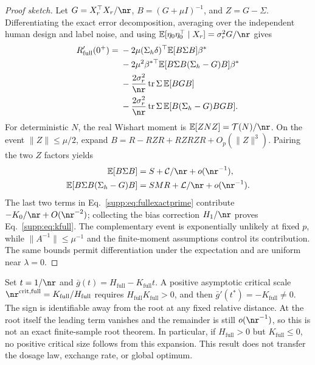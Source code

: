 \begin{proof}[Proof sketch]
Let $G=X_r^\top X_r/\nr$, $B=(G+\mu I)^{-1}$, and $Z=G-\Sigma$. Differentiating the exact error decomposition, averaging over the independent human design and label noise, and using $\mathbb E[\eta_0\eta_0^\top\mid X_r]=\sigma_r^2G/\nr$ gives
\begin{align}
  R_{\mathrm{full}}'(0^+)={}&-2\mu(\Sigma_h\delta)^\top\mathbb E[B\Sigma B]\beta^*\notag\\
  &-2\mu^2\beta^{*\top}\mathbb E[B\Sigma B(\Sigma_h-G)B]\beta^*\notag\\
  &-\frac{2\sigma_r^2}{\nr}\operatorname{tr}\Sigma\,\mathbb E[BGB]\notag\\
  &-\frac{2\sigma_r^2}{\nr}\operatorname{tr}\Sigma\,\mathbb E[B(\Sigma_h-G)BGB].
  \label{supp:eq:fullexactprime}
\end{align}
For deterministic $N$, the real Wishart moment is
$\mathbb E[ZNZ]=\mathcal T(N)/\nr$. On the event $\|Z\|\le\mu/2$, expand
$B=R-RZR+RZRZR+O_p(\|Z\|^3)$.
Pairing the two $Z$ factors yields
\begin{align}
  \mathbb E[B\Sigma B]&=S+\mathcal C/\nr+o(\nr^{-1}),\notag\\
  \mathbb E[B\Sigma B(\Sigma_h-G)B]&=SMR+\mathcal L/\nr+o(\nr^{-1}).
\end{align}
The last two terms in Eq.~\eqref{supp:eq:fullexactprime} contribute $-K_0/\nr+O(\nr^{-2})$; collecting the bias correction $H_1/\nr$ proves Eq.~\eqref{supp:eq:kfull}. The complementary event is exponentially unlikely at fixed $p$, while $\|A^{-1}\|\le\mu^{-1}$ and the finite-moment assumptions control its contribution. The same bounds permit differentiation under the expectation and are uniform near $\lambda=0$.
\end{proof}

\begin{remark}
Set $t=1/\nr$ and $\bar g(t)=H_{\mathrm{full}}-K_{\mathrm{full}}t$. A positive asymptotic critical scale
$\nr^{\mathrm{crit,full}}=K_{\mathrm{full}}/H_{\mathrm{full}}$
requires $H_{\mathrm{full}}K_{\mathrm{full}}>0$, and then $\bar g'(t^*)=-K_{\mathrm{full}}\ne0$. The sign is identifiable away from the root at any fixed relative distance. At the root itself the leading term vanishes and the remainder is still $o(\nr^{-1})$, so this is not an exact finite-sample root theorem. In particular, if $H_{\mathrm{full}}>0$ but $K_{\mathrm{full}}\le0$, no positive critical size follows from this expansion. This result does not transfer the dosage law, exchange rate, or global optimum.
\end{remark}

